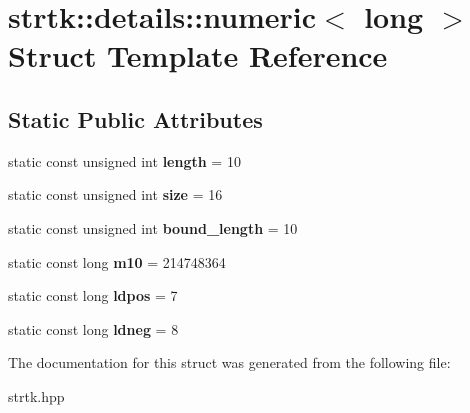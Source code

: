 \hypertarget{structstrtk_1_1details_1_1numeric_3_01long_01_4}{\section{strtk\-:\-:details\-:\-:numeric$<$ long $>$ Struct Template Reference}
\label{structstrtk_1_1details_1_1numeric_3_01long_01_4}
}
\subsection*{Static Public Attributes}
\begin{DoxyCompactItemize}
\item 
\hypertarget{structstrtk_1_1details_1_1numeric_3_01long_01_4_a23939ffd0ab6dcec95308a31cb65d14b}{static const unsigned int {\bfseries length} = 10}\label{structstrtk_1_1details_1_1numeric_3_01long_01_4_a23939ffd0ab6dcec95308a31cb65d14b}

\item 
\hypertarget{structstrtk_1_1details_1_1numeric_3_01long_01_4_acae0abc750d81b77508b4a88d3feeffd}{static const unsigned int {\bfseries size} = 16}\label{structstrtk_1_1details_1_1numeric_3_01long_01_4_acae0abc750d81b77508b4a88d3feeffd}

\item 
\hypertarget{structstrtk_1_1details_1_1numeric_3_01long_01_4_a1effbcf9649348954ab732921f372cc0}{static const unsigned int {\bfseries bound\-\_\-length} = 10}\label{structstrtk_1_1details_1_1numeric_3_01long_01_4_a1effbcf9649348954ab732921f372cc0}

\item 
\hypertarget{structstrtk_1_1details_1_1numeric_3_01long_01_4_ac52a7fd84c8359ef5107fabc2114888e}{static const long {\bfseries m10} = 214748364}\label{structstrtk_1_1details_1_1numeric_3_01long_01_4_ac52a7fd84c8359ef5107fabc2114888e}

\item 
\hypertarget{structstrtk_1_1details_1_1numeric_3_01long_01_4_a38ce1ed26dc80c1b62b00c8be0ebc382}{static const long {\bfseries ldpos} = 7}\label{structstrtk_1_1details_1_1numeric_3_01long_01_4_a38ce1ed26dc80c1b62b00c8be0ebc382}

\item 
\hypertarget{structstrtk_1_1details_1_1numeric_3_01long_01_4_af0d8fbe9434b50251a77cd3bd21f0eb6}{static const long {\bfseries ldneg} = 8}\label{structstrtk_1_1details_1_1numeric_3_01long_01_4_af0d8fbe9434b50251a77cd3bd21f0eb6}

\end{DoxyCompactItemize}


The documentation for this struct was generated from the following file\-:\begin{DoxyCompactItemize}
\item 
strtk.\-hpp\end{DoxyCompactItemize}

